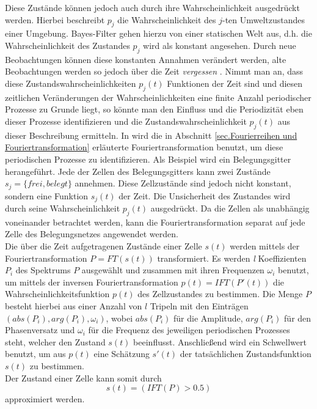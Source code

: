 Diese Zustände können jedoch auch durch ihre Wahrscheinlichkeit ausgedrückt werden. Hierbei beschreibt $p_j$ die Wahrscheinlichkeit des $j$-ten Umweltzustandes einer Umgebung. Bayes-Filter gehen hierzu von einer statischen Welt aus, d.h. die Wahrscheinlichkeit des Zustandes $p_j$ wird als konstant angesehen. Durch neue Beobachtungen können diese konstanten Annahmen verändert werden, alte Beobachtungen werden so jedoch über die Zeit \emph{vergessen} \cite{Krajnik.2014}. Nimmt man an, dass diese Zustandswahrscheinlichkeiten $p_j (t)$ Funktionen der Zeit sind und diesen zeitlichen Veränderungen der Wahrscheinlichkeiten eine finite Anzahl periodischer Prozesse zu Grunde liegt, so könnte man den Einfluss und die Periodizität eben dieser Prozesse identifizieren und die Zustandswahrscheinlichkeit $p_j (t)$ aus dieser Beschreibung ermitteln. In \cite{Krajnik.2014} wird die in Abschnitt \ref{sec.Fourierreihen und Fouriertransformation} erläuterte Fouriertransformation benutzt, um diese periodischen Prozesse zu identifizieren. Als Beispiel wird ein Belegungsgitter herangeführt. Jede der Zellen des Belegungsgitters kann zwei Zustände $s_j = \{frei, belegt\}$ annehmen. Diese Zellzustände sind jedoch nicht konstant, sondern eine Funktion $s_j (t) $ der Zeit. Die Unsicherheit des Zustandes wird durch seine Wahrscheinlichkeit $p_j (t)$ ausgedrückt. Da die Zellen als unabhängig voneinander betrachtet werden, kann die Fouriertransformation separat auf jede Zelle des Belegungsnetzes angewendet werden. \\ Die über die Zeit aufgetragenen Zustände einer Zelle $s(t)$ werden mittels der Fouriertransformation $P = FT(s(t))$ transformiert. Es werden \textit{l} Koeffizienten $P_i$ des Spektrums $P$ ausgewählt und zusammen mit ihren Frequenzen $\omega_i$ benutzt, um mittels der inversen Fouriertransformation $p(t) = IFT(P'(t))$ die Wahrscheinlichkeitsfunktion $p(t)$ des Zellzustandes zu bestimmen. Die Menge $P$ besteht hierbei aus einer Anzahl von $l$ Tripeln mit den Einträgen $(abs(P_i), arg(P_i), \omega_i)$, wobei $abs(P_i)$ für die Amplitude, $arg(P_i)$ für den Phasenversatz und $\omega_i$ für die Frequenz des jeweiligen periodischen Prozesses steht, welcher den Zustand $s(t)$ beeinflusst. Anschließend wird ein Schwellwert benutzt, um aus $p(t)$ eine Schätzung $s'(t)$ der tatsächlichen Zustandsfunktion $s(t)$ zu bestimmen. \\

Der Zustand einer Zelle kann somit durch  
\begin{equation}
	s(t) = (IFT(P) > 0.5)
	\label{eq:Zellzustand}
\end{equation}
approximiert werden.

